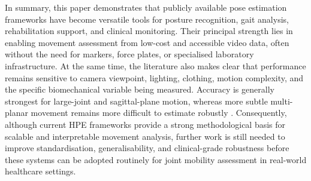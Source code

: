 \documentclass[12pt]{elsarticle}
\begin{document}
In summary, this paper demonstrates that publicly available pose estimation frameworks have become versatile tools for posture recognition, gait analysis, rehabilitation support, and clinical monitoring. Their principal strength lies in enabling movement assessment from low-cost and accessible video data, often without the need for markers, force plates, or specialised laboratory infrastructure. At the same time, the literature also makes clear that performance remains sensitive to camera viewpoint, lighting, clothing, motion complexity, and the specific biomechanical variable being measured. Accuracy is generally strongest for large-joint and sagittal-plane motion, whereas more subtle multi-planar movement remains more difficult to estimate robustly \cite{ong2017efficacy,juri2020characterization,van2023accuracy,stenum2024clinical}. Consequently, although current HPE frameworks provide a strong methodological basis for scalable and interpretable movement analysis, further work is still needed to improve standardisation, generalisability, and clinical-grade robustness before these systems can be adopted routinely for joint mobility assessment in real-world healthcare settings.
\end{document}
